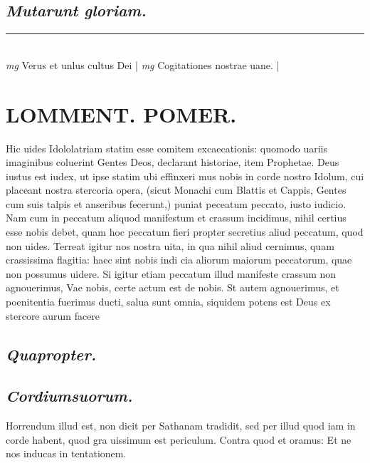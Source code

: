 \documentclass{article}
\begin{document}
\begin{pages}
\subsection*{\textit{Mutarunt gloriam. }}
\vspace{0.5cm}\noindent
\vspace{0.2cm}\rule{1cm}{0.2pt}\\ 
\hspace{0.2cm}\textit{mg}
\footnotesize Verus et unlus cultus Dei 
\normalsize| 
\hspace{0.2cm}\textit{mg}
\footnotesize Cogitationes nostrae uane. 
\normalsize| 
\section*{LOMMENT. POMER. }\pstart Hic uides Idololatriam statim esse comitem excaecationis: quomodo uariis imaginibus coluerint Gentes Deos, declarant historiae, item Prophetae.  \pend\pstart Deus iustus est iudex, ut ipse statim ubi effinxeri mus nobis in corde nostro Idolum, cui placeant nostra stercoria opera, (sicut Monachi cum Blattis et Cappis, Gentes cum suis talpis et anseribus fecerunt,) puniat peceatum peccato, iusto iudicio. Nam cum in peccatum aliquod manifestum et crassum incidimus, nihil certius esse nobis debet, quam hoc peccatum fieri propter secretius aliud peccatum, quod non uides.  Terreat igitur nos nostra uita, in qua nihil aliud cernimus, quam crassissima flagitia: haec sint nobis indi cia aliorum maiorum peccatorum, quae non possumus uidere. Si igitur etiam peccatum illud manifeste crassum non agnouerimus, Vae nobis, certe actum est de nobis. St autem agnouerimus, et poenitentia fuerimus ducti, salua sunt omnia, siquidem potens est Deus ex stercore aurum facere\pend
{}
{}
\subsection*{\textit{Quapropter. }}
{}
\subsection*{\textit{Cordiumsuorum. }}\pstart Horrendum illud est, non dicit per Sathanam tradidit, sed per illud quod iam in corde habent, quod gra uissimum est periculum. Contra quod et oramus: Et ne nos inducas in tentationem.   \pend
{}
{}

\end{pages}
\end{document}
